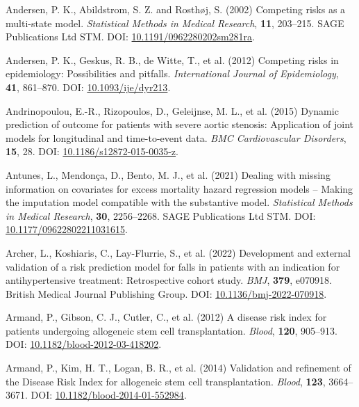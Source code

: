 \documentclass[
  letterpaper,
  DIV=11,
  numbers=noendperiod]{scrreprt}
\newlength{\cslhangindent}
\newenvironment{CSLReferences}[2] %
 {\begin{list}{}{%
  \setlength{\itemindent}{0pt}
  \setlength{\leftmargin}{0pt}
  \setlength{\parsep}{0pt}
  \ifodd #1
   \setlength{\leftmargin}{\cslhangindent}
   \setlength{\itemindent}{-1\cslhangindent}
  \fi
  \setlength{\itemsep}{#2\baselineskip}}}
 {\end{list}}
\begin{document}
\begin{CSLReferences}{1}{1}
Andersen, P. K., Abildstrom, S. Z. and Rosthøj, S. (2002) Competing
risks as a multi-state model. \emph{Statistical Methods in Medical
Research}, \textbf{11}, 203--215. SAGE Publications Ltd STM. DOI:
\href{https://doi.org/10.1191/0962280202sm281ra}{10.1191/0962280202sm281ra}.

Andersen, P. K., Geskus, R. B., de Witte, T., et al. (2012) Competing
risks in epidemiology: Possibilities and pitfalls. \emph{International
Journal of Epidemiology}, \textbf{41}, 861--870. DOI:
\href{https://doi.org/10.1093/ije/dyr213}{10.1093/ije/dyr213}.

Andrinopoulou, E.-R., Rizopoulos, D., Geleijnse, M. L., et al. (2015)
Dynamic prediction of outcome for patients with severe aortic stenosis:
Application of joint models for longitudinal and time-to-event data.
\emph{BMC Cardiovascular Disorders}, \textbf{15}, 28. DOI:
\href{https://doi.org/10.1186/s12872-015-0035-z}{10.1186/s12872-015-0035-z}.

Antunes, L., Mendonça, D., Bento, M. J., et al. (2021) Dealing with
missing information on covariates for excess mortality hazard regression
models -- {Making} the imputation model compatible with the substantive
model. \emph{Statistical Methods in Medical Research}, \textbf{30},
2256--2268. SAGE Publications Ltd STM. DOI:
\href{https://doi.org/10.1177/09622802211031615}{10.1177/09622802211031615}.

Archer, L., Koshiaris, C., Lay-Flurrie, S., et al. (2022) Development
and external validation of a risk prediction model for falls in patients
with an indication for antihypertensive treatment: Retrospective cohort
study. \emph{BMJ}, \textbf{379}, e070918. British Medical Journal
Publishing Group. DOI:
\href{https://doi.org/10.1136/bmj-2022-070918}{10.1136/bmj-2022-070918}.

Armand, P., Gibson, C. J., Cutler, C., et al. (2012) A disease risk
index for patients undergoing allogeneic stem cell transplantation.
\emph{Blood}, \textbf{120}, 905--913. DOI:
\href{https://doi.org/10.1182/blood-2012-03-418202}{10.1182/blood-2012-03-418202}.

Armand, P., Kim, H. T., Logan, B. R., et al. (2014) Validation and
refinement of the {Disease Risk Index} for allogeneic stem cell
transplantation. \emph{Blood}, \textbf{123}, 3664--3671. DOI:
\href{https://doi.org/10.1182/blood-2014-01-552984}{10.1182/blood-2014-01-552984}.


\end{CSLReferences}
\end{document}
